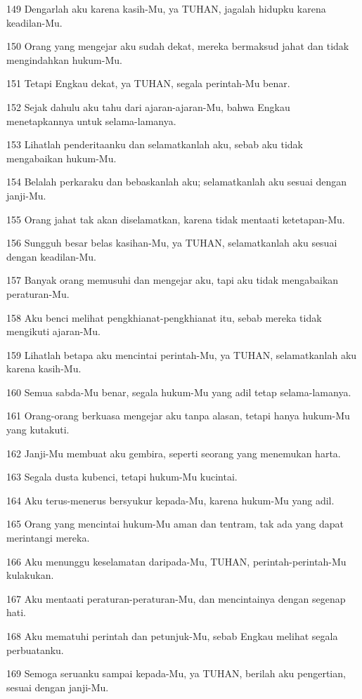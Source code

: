 \par 149 Dengarlah aku karena kasih-Mu, ya TUHAN, jagalah hidupku karena keadilan-Mu.
\par 150 Orang yang mengejar aku sudah dekat, mereka bermaksud jahat dan tidak mengindahkan hukum-Mu.
\par 151 Tetapi Engkau dekat, ya TUHAN, segala perintah-Mu benar.
\par 152 Sejak dahulu aku tahu dari ajaran-ajaran-Mu, bahwa Engkau menetapkannya untuk selama-lamanya.
\par 153 Lihatlah penderitaanku dan selamatkanlah aku, sebab aku tidak mengabaikan hukum-Mu.
\par 154 Belalah perkaraku dan bebaskanlah aku; selamatkanlah aku sesuai dengan janji-Mu.
\par 155 Orang jahat tak akan diselamatkan, karena tidak mentaati ketetapan-Mu.
\par 156 Sungguh besar belas kasihan-Mu, ya TUHAN, selamatkanlah aku sesuai dengan keadilan-Mu.
\par 157 Banyak orang memusuhi dan mengejar aku, tapi aku tidak mengabaikan peraturan-Mu.
\par 158 Aku benci melihat pengkhianat-pengkhianat itu, sebab mereka tidak mengikuti ajaran-Mu.
\par 159 Lihatlah betapa aku mencintai perintah-Mu, ya TUHAN, selamatkanlah aku karena kasih-Mu.
\par 160 Semua sabda-Mu benar, segala hukum-Mu yang adil tetap selama-lamanya.
\par 161 Orang-orang berkuasa mengejar aku tanpa alasan, tetapi hanya hukum-Mu yang kutakuti.
\par 162 Janji-Mu membuat aku gembira, seperti seorang yang menemukan harta.
\par 163 Segala dusta kubenci, tetapi hukum-Mu kucintai.
\par 164 Aku terus-menerus bersyukur kepada-Mu, karena hukum-Mu yang adil.
\par 165 Orang yang mencintai hukum-Mu aman dan tentram, tak ada yang dapat merintangi mereka.
\par 166 Aku menunggu keselamatan daripada-Mu, TUHAN, perintah-perintah-Mu kulakukan.
\par 167 Aku mentaati peraturan-peraturan-Mu, dan mencintainya dengan segenap hati.
\par 168 Aku mematuhi perintah dan petunjuk-Mu, sebab Engkau melihat segala perbuatanku.
\par 169 Semoga seruanku sampai kepada-Mu, ya TUHAN, berilah aku pengertian, sesuai dengan janji-Mu.
